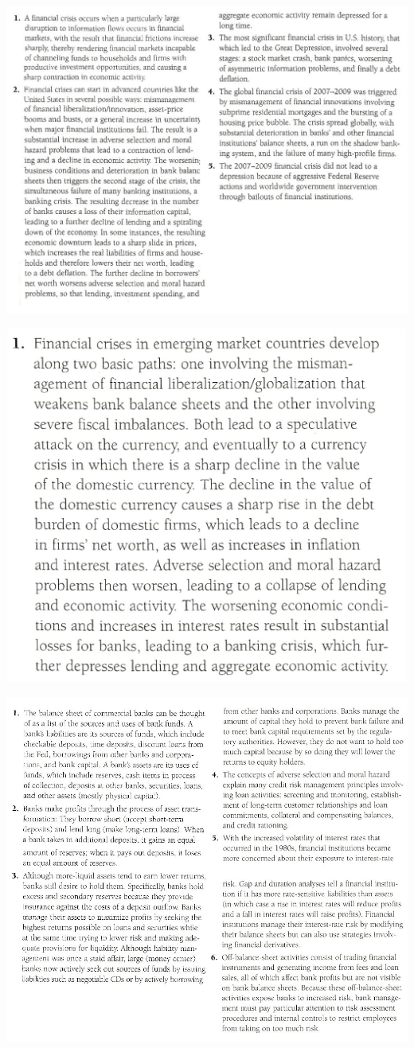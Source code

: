 \documentclass[12pt]{examnotes}
\begin{document}
\includegraphics[scale=0.5]{./imgs/sum9.jpg}

\includegraphics[scale=0.25]{./imgs/sum10.jpg}

\includegraphics[scale=0.5]{./imgs/sum11.jpg}
\end{document}
